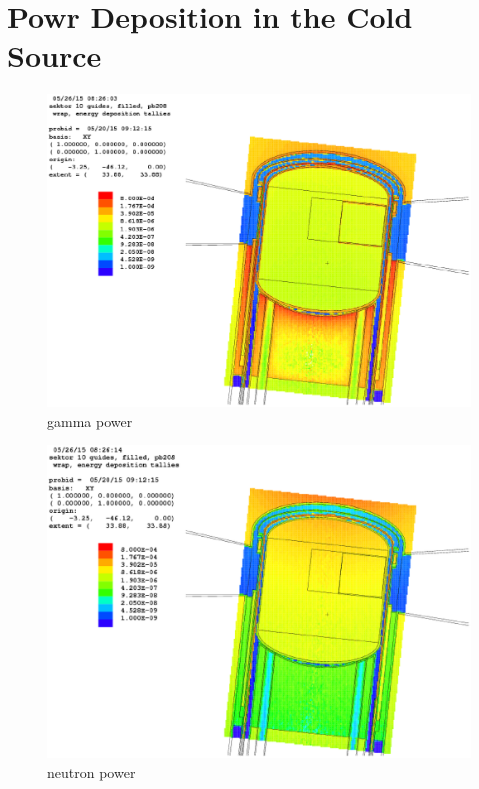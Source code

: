 \documentclass[preprint,12pt]{elsarticle}
\begin{document}
\section{Powr Deposition in the Cold Source}


\begin{figure}
\begin{center}
\includegraphics[scale=0.45]{graphics/power_dep_xy_g.eps}
\end{center}
\caption{\label{power_horiz}gamma power}
\end{figure}

\begin{figure}
\begin{center}
\includegraphics[scale=0.45]{graphics/power_dep_xy_n.eps}
\end{center}
\caption{\label{power_horiz}neutron power}
\end{figure}
\end{document}
